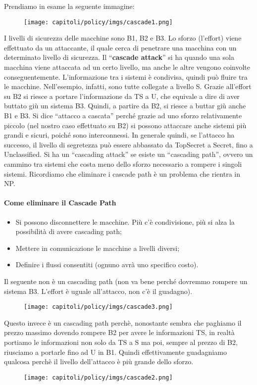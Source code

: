 Prendiamo in esame la seguente immagine:
\begin{figure}[H]
    \centering
    \texttt{[image: capitoli/policy/imgs/cascade1.png]}
\end{figure}
I livelli di sicurezza delle macchine sono B1, B2 e B3. Lo
sforzo (l'effort) viene effettuato da un attaccante, il quale
cerca di penetrare una macchina con un determinato livello
di sicurezza.
Il ``\textbf{cascade attack}'' si ha quando una sola macchina viene attaccata ad
un certo livello, ma anche
le altre vengono coinvolte conseguentemente.
L'informazione tra i sistemi è condivisa, quindi può fluire tra le macchine.
Nell'esempio, infatti, sono
tutte collegate a livello S. Grazie all'effort su B2 si riesce a portare
l'informazione da TS a U, che
equivale a dire di aver buttato giù un sistema B3. Quindi, a partire da B2,
si riesce a buttar giù
anche B1 e B3.
Si dice ``attacco a cascata'' perché grazie ad uno sforzo relativamente piccolo
(nel nostro caso
effettuato su B2) si possono attaccare anche sistemi più grandi e sicuri,
poiché sono interconnessi.
In generale quindi, se l'attacco ha successo, il livello di segretezza può
essere abbassato da
TopSecret a Secret, fino a Unclassified.
Si ha un ``cascading attack'' se esiste un ``cascading path'', ovvero un cammino
tra sistemi che
costa meno dello sforzo necessario a rompere i singoli sistemi.
Ricordiamo che eliminare i cascade path è un problema che rientra in NP.

\paragraph{Come eliminare il Cascade Path}
\begin{itemize}
    \item  Si possono disconnettere le macchine. Più c'è condivisione,
          più si alza la possibilità di
          avere cascading path;
    \item  Mettere in comunicazione le macchine a livelli diversi;
    \item  Definire i flussi consentiti (ognuno avrà uno specifico costo).
\end{itemize}
Il seguente non è un cascading path (non va bene perché dovremmo
rompere un sistema B3. L'effort è uguale all'attacco, non c'è il
guadagno).
\begin{figure}[H]
    \centering
    \texttt{[image: capitoli/policy/imgs/cascade3.png]}
\end{figure}
Questo invece è un cascading path perchè, nonostante sembra che paghiamo il prezzo massimo dovendo rompere B2 per avere le informazioni TS, in realtà portiamo le informazioni non solo da TS a S ma poi, sempre al prezzo di B2, riusciamo a portarle fino ad U in B1. Quindi effettivamente guadagniamo qualcosa perchè il livello dell'attacco è più grande dello sforzo.
\begin{figure}[H]
    \centering
    \texttt{[image: capitoli/policy/imgs/cascade2.png]}
\end{figure}


